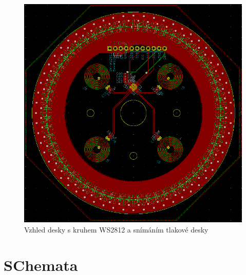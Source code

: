 \begin{figure}[htbp]
    \centering
    \includegraphics[width=\textwidth]{kapitoly/obrazky/E4/elektronika_tlakove_desky/leddeska-KiCad.png}
    \caption{Vzhled desky s kruhem WS2812 a snímáním tlakové desky}
    \label{fig:E4-LedDeska}
\end{figure}

\section*{SChemata}

